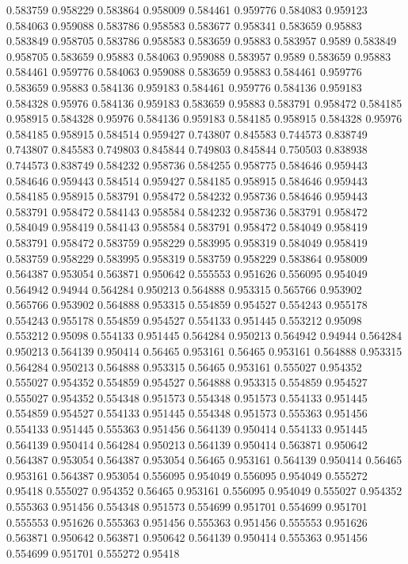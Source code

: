 0.583759 0.958229
0.583864 0.958009
0.584461 0.959776
0.584083 0.959123
0.584063 0.959088
0.583786 0.958583
0.583677 0.958341
0.583659 0.95883
0.583849 0.958705
0.583786 0.958583
0.583659 0.95883
0.583957 0.9589
0.583849 0.958705
0.583659 0.95883
0.584063 0.959088
0.583957 0.9589
0.583659 0.95883
0.584461 0.959776
0.584063 0.959088
0.583659 0.95883
0.584461 0.959776
0.583659 0.95883
0.584136 0.959183
0.584461 0.959776
0.584136 0.959183
0.584328 0.95976
0.584136 0.959183
0.583659 0.95883
0.583791 0.958472
0.584185 0.958915
0.584328 0.95976
0.584136 0.959183
0.584185 0.958915
0.584328 0.95976
0.584185 0.958915
0.584514 0.959427
0.743807 0.845583
0.744573 0.838749
0.743807 0.845583
0.749803 0.845844
0.749803 0.845844
0.750503 0.838938
0.744573 0.838749
0.584232 0.958736
0.584255 0.958775
0.584646 0.959443
0.584646 0.959443
0.584514 0.959427
0.584185 0.958915
0.584646 0.959443
0.584185 0.958915
0.583791 0.958472
0.584232 0.958736
0.584646 0.959443
0.583791 0.958472
0.584143 0.958584
0.584232 0.958736
0.583791 0.958472
0.584049 0.958419
0.584143 0.958584
0.583791 0.958472
0.584049 0.958419
0.583791 0.958472
0.583759 0.958229
0.583995 0.958319
0.584049 0.958419
0.583759 0.958229
0.583995 0.958319
0.583759 0.958229
0.583864 0.958009
0.564387 0.953054
0.563871 0.950642
0.555553 0.951626
0.556095 0.954049
0.564942 0.94944
0.564284 0.950213
0.564888 0.953315
0.565766 0.953902
0.565766 0.953902
0.564888 0.953315
0.554859 0.954527
0.554243 0.955178
0.554243 0.955178
0.554859 0.954527
0.554133 0.951445
0.553212 0.95098
0.553212 0.95098
0.554133 0.951445
0.564284 0.950213
0.564942 0.94944
0.564284 0.950213
0.564139 0.950414
0.56465 0.953161
0.56465 0.953161
0.564888 0.953315
0.564284 0.950213
0.564888 0.953315
0.56465 0.953161
0.555027 0.954352
0.555027 0.954352
0.554859 0.954527
0.564888 0.953315
0.554859 0.954527
0.555027 0.954352
0.554348 0.951573
0.554348 0.951573
0.554133 0.951445
0.554859 0.954527
0.554133 0.951445
0.554348 0.951573
0.555363 0.951456
0.554133 0.951445
0.555363 0.951456
0.564139 0.950414
0.554133 0.951445
0.564139 0.950414
0.564284 0.950213
0.564139 0.950414
0.563871 0.950642
0.564387 0.953054
0.564387 0.953054
0.56465 0.953161
0.564139 0.950414
0.56465 0.953161
0.564387 0.953054
0.556095 0.954049
0.556095 0.954049
0.555272 0.95418
0.555027 0.954352
0.56465 0.953161
0.556095 0.954049
0.555027 0.954352
0.555363 0.951456
0.554348 0.951573
0.554699 0.951701
0.554699 0.951701
0.555553 0.951626
0.555363 0.951456
0.555363 0.951456
0.555553 0.951626
0.563871 0.950642
0.563871 0.950642
0.564139 0.950414
0.555363 0.951456
0.554699 0.951701
0.555272 0.95418
